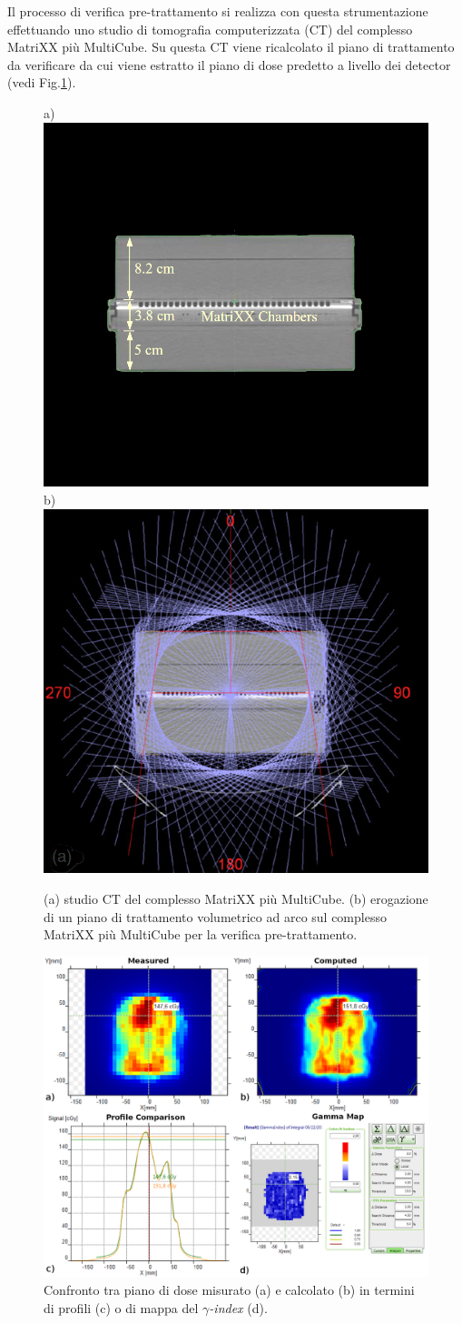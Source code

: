 Il processo di verifica pre-trattamento si realizza con questa strumentazione effettuando uno studio di tomografia computerizzata (CT) del complesso MatriXX più MultiCube. Su questa CT viene ricalcolato il piano di trattamento da verificare da cui viene estratto il piano di dose predetto a livello dei detector (vedi Fig.\ref{fig:MatriXX_CT}).
\begin{figure}
\centering
a)\includegraphics[width=.43\textwidth]{./cap2/MatriXX_CT.png}
b)\includegraphics[width=.43\textwidth]{./cap2/MatriXX_CT_Plan.png}
\caption{(a) studio CT del complesso MatriXX più MultiCube. (b) erogazione di un piano di trattamento volumetrico ad arco sul complesso MatriXX più MultiCube per la verifica pre-trattamento.}
\label{fig:MatriXX_CT}
\end{figure}
\begin{figure}
\centering
\includegraphics[width=\textwidth]{./cap2/gamma_comparison.png}
\caption{Confronto tra piano di dose misurato (a) e calcolato (b) in termini di profili (c) o di mappa del $\gamma$\textit{-index} (d).}
\label{fig:gamma_comparison}
\end{figure}

